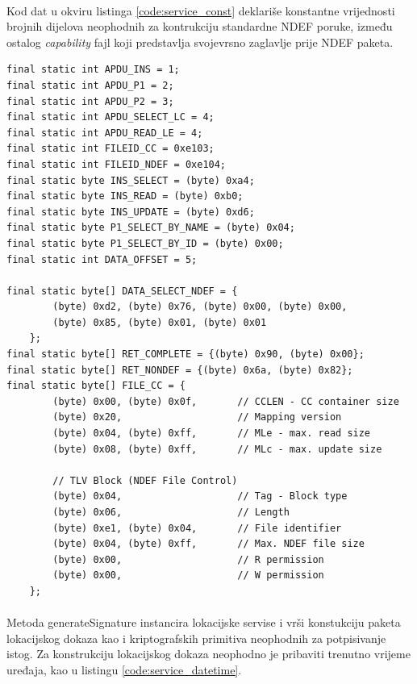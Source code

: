 \paragraph*{}
Kod dat u okviru listinga \ref{code:service_const} deklariše konstantne vrijednosti brojnih dijelova neophodnih za kontrukciju standardne NDEF poruke, između ostalog \textit{capability} fajl koji predstavlja svojevrsno zaglavlje prije NDEF paketa.

\begin{code}
\begin{verbatim}
final static int APDU_INS = 1;
final static int APDU_P1 = 2;
final static int APDU_P2 = 3;
final static int APDU_SELECT_LC = 4;
final static int APDU_READ_LE = 4;
final static int FILEID_CC = 0xe103;
final static int FILEID_NDEF = 0xe104;
final static byte INS_SELECT = (byte) 0xa4;
final static byte INS_READ = (byte) 0xb0;
final static byte INS_UPDATE = (byte) 0xd6;
final static byte P1_SELECT_BY_NAME = (byte) 0x04;
final static byte P1_SELECT_BY_ID = (byte) 0x00;
final static int DATA_OFFSET = 5;

final static byte[] DATA_SELECT_NDEF = {
        (byte) 0xd2, (byte) 0x76, (byte) 0x00, (byte) 0x00,
        (byte) 0x85, (byte) 0x01, (byte) 0x01
    };
final static byte[] RET_COMPLETE = {(byte) 0x90, (byte) 0x00};
final static byte[] RET_NONDEF = {(byte) 0x6a, (byte) 0x82};
final static byte[] FILE_CC = {
        (byte) 0x00, (byte) 0x0f,       // CCLEN - CC container size
        (byte) 0x20,                    // Mapping version
        (byte) 0x04, (byte) 0xff,       // MLe - max. read size
        (byte) 0x08, (byte) 0xff,       // MLc - max. update size

        // TLV Block (NDEF File Control)
        (byte) 0x04,                    // Tag - Block type
        (byte) 0x06,                    // Length
        (byte) 0xe1, (byte) 0x04,       // File identifier
        (byte) 0x04, (byte) 0xff,       // Max. NDEF file size
        (byte) 0x00,                    // R permission
        (byte) 0x00,                    // W permission
    };
\end{verbatim}
\label{code:service_const}
\end{code}

\paragraph*{}
Metoda generateSignature instancira lokacijske servise i vrši konstukciju paketa lokacijskog dokaza kao i kriptografskih primitiva neophodnih za potpisivanje istog. Za konstrukciju lokacijskog dokaza neophodno je pribaviti trenutno vrijeme uređaja, kao u listingu \ref{code:service_datetime}.

